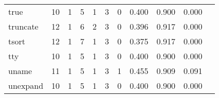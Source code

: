 \begin{longtable}{lp{1.2cm}p{1.2cm}p{1.2cm}p{1.2cm}p{1.2cm}p{1.2cm}p{1.2cm}p{1.2cm}p{1.2cm}p{1.2cm}}
true      &                                    10 &                                                  1 &                                                  5 &                                                  1 &                                                  3 &                                                  0 &                                         0.400 &                                              0.900 &                                              0.000 \\
truncate  &                                    12 &                                                  1 &                                                  6 &                                                  2 &                                                  3 &                                                  0 &                                         0.396 &                                              0.917 &                                              0.000 \\
tsort     &                                    12 &                                                  1 &                                                  7 &                                                  1 &                                                  3 &                                                  0 &                                         0.375 &                                              0.917 &                                              0.000 \\
tty       &                                    10 &                                                  1 &                                                  5 &                                                  1 &                                                  3 &                                                  0 &                                         0.400 &                                              0.900 &                                              0.000 \\
uname     &                                    11 &                                                  1 &                                                  5 &                                                  1 &                                                  3 &                                                  1 &                                         0.455 &                                              0.909 &                                              0.091 \\
unexpand  &                                    10 &                                                  1 &                                                  5 &                                                  1 &                                                  3 &                                                  0 &                                         0.400 &                                              0.900 &                                              0.000 \\

\end{longtable}
